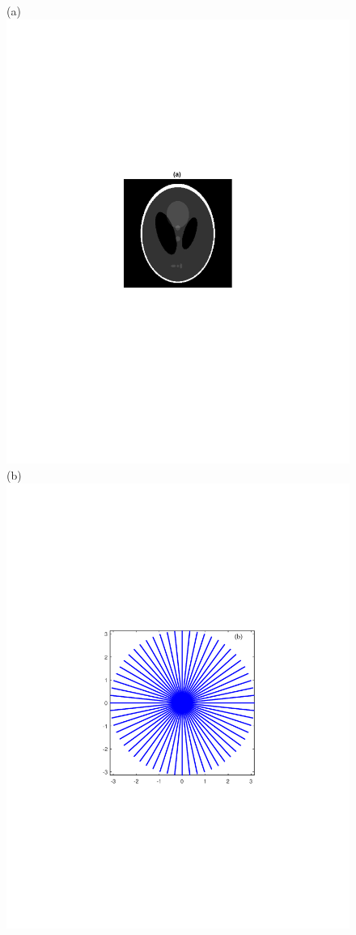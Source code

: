 \documentclass{UCF_ETD}
\begin{document}
\begin{figure}[H]   
\begin{center}
(a)\includegraphics[scale=0.5]{SparseViewCT/OriginalPhantom}
(b)\includegraphics[scale=0.3]{SparseViewCT/PolarSampling}

\end{center}
\end{figure}
\end{document}
